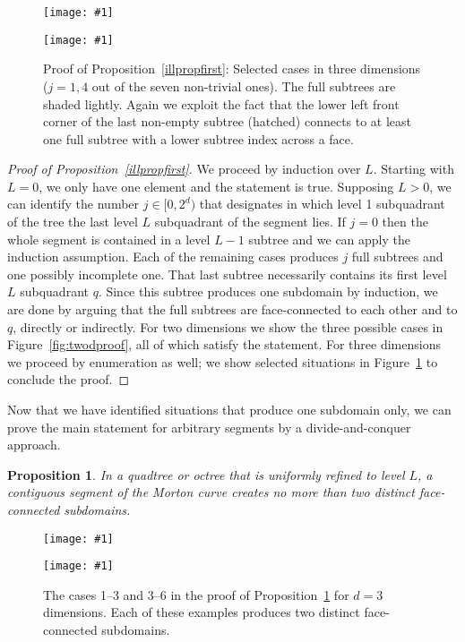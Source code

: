 \documentclass[a4paper,11pt]{article}
\newcommand{\inputtikz}[1]{\texttt{[image: \#1]}}
\newcommand{\figlab}[1]{\label{fig:#1}}
\newcommand{\figref}[1]{Figure~\ref{fig:#1}}
\newtheorem{prop}[thm]{Proposition}
\begin{document}
\begin{figure}\centering
\begin{minipage}{0.49\textwidth}\centering
    \inputtikz{threedproof1}
  \end{minipage}
  \begin{minipage}{0.49\textwidth}\centering
    \inputtikz{threedproof2}
  \end{minipage}
  \caption{Proof of Proposition~\ref{illpropfirst}:   Selected cases in three
    dimensions ($j = 1, 4$ out of the seven non-trivial ones).  The full
    subtrees are shaded lightly.  Again we exploit the fact that the lower
    left front corner of the last non-empty subtree (hatched) connects to at
    least one full subtree with a lower subtree index across a face.}
  \figlab{threedproof}
\end{figure}
\begin{proof}[Proof of Proposition~\ref{illpropfirst}]
  We proceed by induction over $L$.  Starting with $L=0$, we only have one
  element and the statement is true.  Supposing $L > 0$, we can identify the
  number $j \in [0, 2^d)$ that designates in which level 1
  subquadrant of the tree the last level $L$ subquadrant of the segment lies.
  If $j = 0$ then the whole segment is contained in a level $L-1$ subtree and
  we can apply the induction assumption.  Each of the remaining cases produces
  $j$ full subtrees and one possibly incomplete one.  That last subtree
  necessarily contains its first level $L$ subquadrant $q$.  Since this subtree
  produces one subdomain by induction, we are done by arguing that the full
  subtrees are face-connected to each other and to $q$, directly or indirectly.
  For two dimensions we show the three possible cases in \figref{twodproof},
  all of which satisfy the statement.  For three dimensions we proceed by
  enumeration as well; we show selected situations in \figref{threedproof} to
  conclude the proof.
\end{proof}
Now that we have identified situations that produce one subdomain only, we can
prove the main statement for arbitrary segments by a divide-and-conquer
approach.
\begin{prop}
  \label{illpropboth}
  In a quadtree or octree that is uniformly refined to level $L$, a contiguous
  segment of the Morton curve creates no more than two distinct face-connected
  subdomains.
\end{prop}
\begin{figure}\centering
\begin{minipage}{0.49\textwidth}\centering
    \inputtikz{threedcases1}
  \end{minipage}
  \begin{minipage}{0.49\textwidth}\centering
    \inputtikz{threedcases2}
  \end{minipage}
  \caption{The cases 1--3 and 3--6{} in the proof of
           Proposition~\ref{illpropboth} for $d = 3$ dimensions.  Each of these
           examples produces two distinct face-connected subdomains.}
  \figlab{threedcases}
\end{figure}
\end{document}
